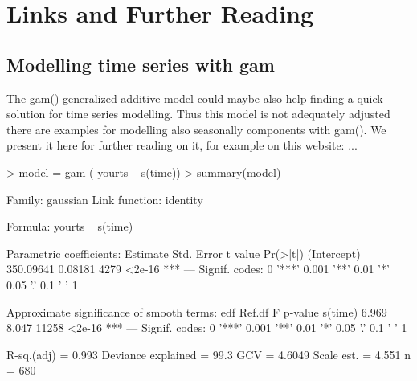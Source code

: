 \documentclass[11pt, a4paper]{article} %
\begin{document}
\section{Links and Further Reading}%


\subsection{Modelling time series with gam}

The gam() generalized additive model could maybe also help finding a quick solution for time series modelling. Thus this model is not adequately adjusted there are examples for modelling also seasonally components with gam(). We present it here for further reading on it, for example on this website: ... 


\begin{Schunk}
\begin{Sinput}
> model = gam ( yourts ~ s(time))
> summary(model)
\end{Sinput}
Family: gaussian 
Link function: identity 

Formula:
yourts ~ s(time)

Parametric coefficients:
             Estimate Std. Error t value Pr(>|t|)    
(Intercept) 350.09641    0.08181    4279   <2e-16 ***
---
Signif. codes:  
0 '***' 0.001 '**' 0.01 '*' 0.05 '.' 0.1 ' ' 1

Approximate significance of smooth terms:
          edf Ref.df     F p-value    
s(time) 6.969  8.047 11258  <2e-16 ***
---
Signif. codes:  
0 '***' 0.001 '**' 0.01 '*' 0.05 '.' 0.1 ' ' 1

R-sq.(adj) =  0.993   Deviance explained = 99.3%
GCV = 4.6049  Scale est. = 4.551     n = 680\end{Schunk}
\end{document}
